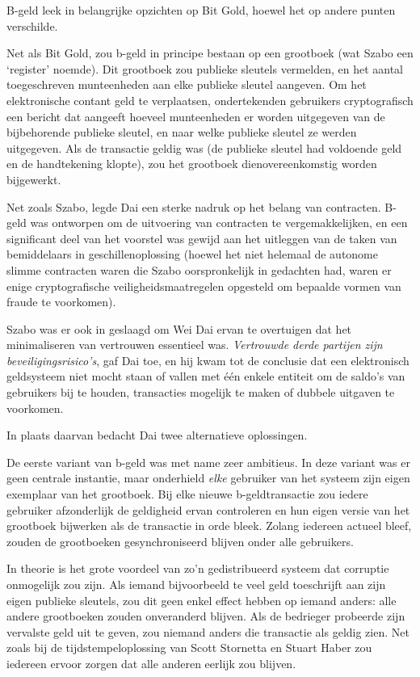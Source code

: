 \documentclass[smalldemyvopaper,11pt,twoside,onecolumn,openright,extrafontsizes,hidelinks]{memoir}
\begin{document}
B-geld leek in belangrijke opzichten op Bit Gold, hoewel het op andere
punten verschilde.

Net als Bit Gold, zou b-geld in principe bestaan op een grootboek (wat
Szabo een `register' noemde). Dit grootboek zou publieke sleutels
vermelden, en het aantal toegeschreven munteenheden aan elke publieke
sleutel aangeven. Om het elektronische contant geld te verplaatsen,
ondertekenden gebruikers cryptografisch een bericht dat aangeeft hoeveel
munteenheden er worden uitgegeven van de bijbehorende publieke sleutel,
en naar welke publieke sleutel ze werden uitgegeven. Als de transactie
geldig was (de publieke sleutel had voldoende geld en de handtekening
klopte), zou het grootboek dienovereenkomstig worden bijgewerkt.

Net zoals Szabo, legde Dai een sterke nadruk op het belang van
contracten. B-geld was ontworpen om de uitvoering van contracten te
vergemakkelijken, en een significant deel van het voorstel was gewijd
aan het uitleggen van de taken van bemiddelaars in geschillenoplossing
(hoewel het niet helemaal de autonome slimme contracten waren die Szabo
oorspronkelijk in gedachten had, waren er enige cryptografische
veiligheidsmaatregelen opgesteld om bepaalde vormen van fraude te
voorkomen).

Szabo was er ook in geslaagd om Wei Dai ervan te overtuigen dat het
minimaliseren van vertrouwen essentieel was. \emph{Vertrouwde derde
partijen zijn beveiligingsrisico's}, gaf Dai toe, en hij kwam tot de
conclusie dat een elektronisch geldsysteem niet mocht staan of vallen
met één enkele entiteit om de saldo's van gebruikers bij te houden,
transacties mogelijk te maken of dubbele uitgaven te voorkomen.

In plaats daarvan bedacht Dai twee alternatieve oplossingen.

De eerste variant van b-geld was met name zeer ambitieus. In deze
variant was er geen centrale instantie, maar onderhield \emph{elke}
gebruiker van het systeem zijn eigen exemplaar van het grootboek. Bij
elke nieuwe b-geldtransactie zou iedere gebruiker afzonderlijk de
geldigheid ervan controleren en hun eigen versie van het grootboek
bijwerken als de transactie in orde bleek. Zolang iedereen actueel
bleef, zouden de grootboeken gesynchroniseerd blijven onder alle
gebruikers.

In theorie is het grote voordeel van zo'n gedistribueerd systeem dat
corruptie onmogelijk zou zijn. Als iemand bijvoorbeeld te veel geld
toeschrijft aan zijn eigen publieke sleutels, zou dit geen enkel effect
hebben op iemand anders: alle andere grootboeken zouden onveranderd
blijven. Als de bedrieger probeerde zijn vervalste geld uit te geven,
zou niemand anders die transactie als geldig zien. Net zoals bij de
tijdstempeloplossing van Scott Stornetta en Stuart Haber zou iedereen
ervoor zorgen dat alle anderen eerlijk zou blijven.
\end{document}
